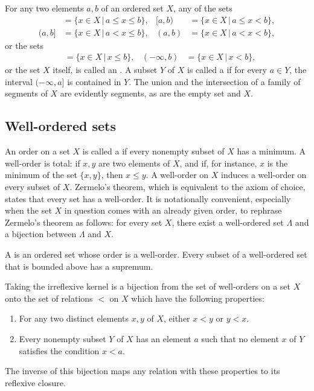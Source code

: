 \documentclass{article}
\begin{document}
For any two elements \(a, b\) of an ordered set \(X\), any of the sets
\begin{align*}
  [a, b]& = \{ x \in X \,\vert\, a \leq x \leq b \},&
  [a, b)& = \{ x \in X \,\vert\, a \leq x < b \}, \\
  (a, b]& = \{ x \in X \,\vert\, a < x \leq b \},&
  (a, b)& = \{ x \in X \,\vert\, a < x < b \},
\end{align*}
or the sets
\begin{align*}
    [a, \infty)& = \{ x \in X \,\vert\, a \leq x \},&
  (a, \infty)& = \{ x \in X \,\vert\, a < x \}, \\
  (-\infty, b]& = \{ x \in X \,\vert\, x \leq b \},&
  (-\infty, b)& = \{ x \in X \,\vert\, x < b \},
\end{align*}
or the set \(X\) itself, is called an .  A subset
\(Y\) of \(X\) is called a  if for every
\(a \in Y\), the interval \((-\infty, a]\) is contained in \(Y\).  The
union and the intersection of a family of segments of \(X\) are
evidently segments, as are the empty set and \(X\).

\subsection{Well-ordered sets}
\label{sec:62tryw49}

An order on a set \(X\) is called a  if every
nonempty subset of \(X\) has a minimum.  A well-order is total: if
\(x,y\) are two elements of \(X\), and if, for instance, \(x\) is the
minimum of the set \(\{ x, y \}\), then \(x \leq y\).  A well-order on
\(X\) induces a well-order on every subset of \(X\).  Zermelo's
theorem, which is equivalent to the axiom of choice, states that every
set has a well-order.  It is notationally convenient, especially when
the set \(X\) in question comes with an already given order, to
rephrase Zermelo's theorem as follows: for every set \(X\), there
exist a well-ordered set \(\Lambda\) and a bijection between
\(\Lambda\) and \(X\).

A  is an ordered set whose order is a
well-order.  Every subset of a well-ordered set that is bounded above
has a supremum.

\begin{theorem}
  \label{thm:3uwc4uyw}
  Taking the irreflexive kernel is a bijection from the set of
  well-orders on a set \(X\) onto the set of relations \(<\) on \(X\)
  which have the following properties:
  \begin{enumerate}
  \item For any two distinct elements \(x, y\) of \(X\), either
    \(x < y\) or \(y < x\).
  \item Every nonempty subset \(Y\) of \(X\) has an element \(a\) such
    that no element \(x\) of \(Y\) satisfies the condition \(x < a\).
  \end{enumerate}
  The inverse of this bijection maps any relation with these
  properties to its reflexive closure.
\end{theorem}
\end{document}
